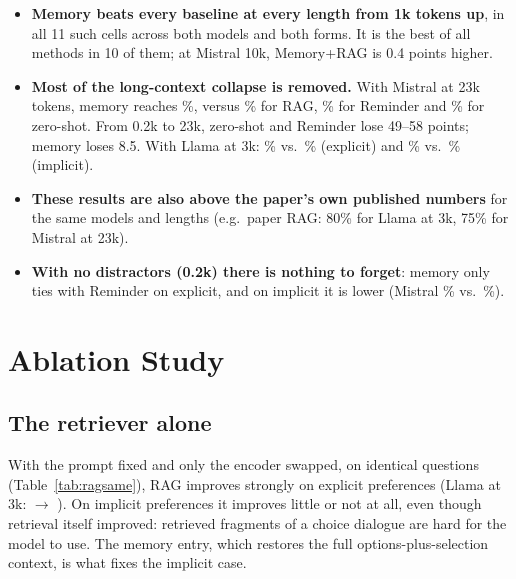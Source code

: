 \documentclass[lettersize,journal]{IEEEtran}
\begin{document}
\begin{itemize}
  \item \textbf{Memory beats every baseline at every length from 1k tokens up}, in all 11 such cells across both models and both forms. It is
        the best of all methods in 10 of them; at Mistral 10k, Memory+RAG is 0.4 points higher.
  \item \textbf{Most of the long-context collapse is removed.} With Mistral at 23k tokens, memory reaches \qMiMemTwentyThree\%, versus \qMiRagTwentyThree\% for
        RAG, \qMiRemTwentyThree\% for Reminder and \qMiZsTwentyThree\% for zero-shot. From 0.2k to 23k, zero-shot and Reminder lose 49--58 points;
        memory loses 8.5. With Llama at 3k: \qLlExMemThree\% vs.\ \qLlExRagThree\% (explicit) and \qLlImMemThree\% vs.\ \qLlImRagThree\% (implicit).
  \item \textbf{These results are also above the paper's own published numbers} for the same models and lengths (e.g.\ paper RAG: 80\% for Llama at 3k,
        75\% for Mistral at 23k).
  \item \textbf{With no distractors (0.2k) there is nothing to forget}: memory only ties with Reminder on explicit, and on implicit it is lower
        (Mistral \qMiImMemZero\% vs.\ \qMiImRemZero\%).
\end{itemize}

\section{Ablation Study}

\subsection{The retriever alone}
With the prompt fixed and only the encoder swapped, on identical questions (Table~\ref{tab:ragsame}), RAG improves strongly on explicit
preferences (Llama at 3k: \qLlExRagThree{} $\rightarrow$ \qLlExGemThree). On implicit preferences it improves little or not at all, even though
retrieval itself improved: retrieved fragments of a choice dialogue are hard for the model to use. The memory entry, which restores the full
options-plus-selection context, is what fixes the implicit case.

\begin{table}[!t]
\caption{RAG with SimCSE vs.\ EmbeddingGemma-2 (same prompt, same questions), and Memory+RAG.}
\label{tab:ragsame}
\centering\small

\end{table}
\end{document}
